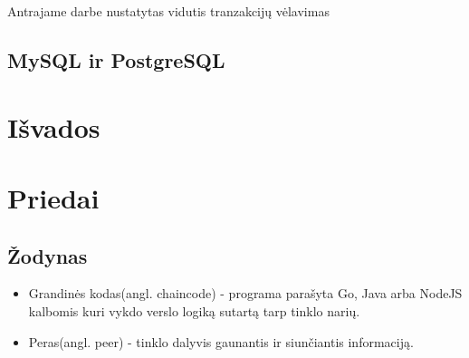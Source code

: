 \documentclass{VUMIFPSkursinis}
\begin{document}
					Antrajame darbe \cite{ThailandPerf} nustatytas vidutis tranzakcijų vėlavimas 
					
									


			

	\subsection{MySQL ir PostgreSQL}

\section{Išvados}

\section{Priedai}
\subsection{Žodynas}
\begin{itemize}
	\item{Grandinės kodas(angl. chaincode) - programa parašyta Go, Java arba NodeJS kalbomis kuri vykdo
 verslo logiką sutartą tarp tinklo narių.}
	\item{Peras(angl. peer) - tinklo dalyvis gaunantis ir siunčiantis informaciją.}
\end{itemize}


\printbibliography[heading=bibintoc]  
\end{document}
